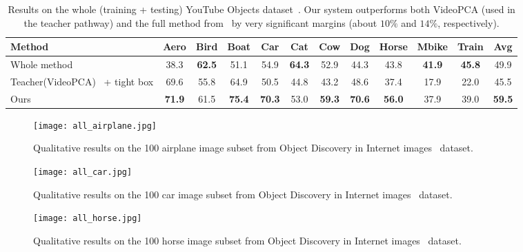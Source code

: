 \documentclass[10pt,twocolumn,letterpaper]{article}
\begin{document}
\begin{table*}[ht]
\begin{center}
\begin{tabular}{|l|*{10}{c|}|c|}
\hline
Method & Aero & Bird & Boat & Car & Cat & Cow & Dog & Horse & Mbike & Train & Avg \\
\hline\hline
Whole method~\cite{stretcu2015multiple} & 38.3 & \textbf{62.5} & 51.1 & 54.9 & \textbf{64.3} & 52.9 & 44.3 & 43.8 & \textbf{41.9} & \textbf{45.8} & 49.9 \\
Teacher(VideoPCA)~\cite{stretcu2015multiple} + tight box & 69.6 & 55.8 & 64.9 & 50.5 & 44.8 & 43.2 & 48.6 & 37.4 & 17.9 & 22.0 & 45.5 \\
\hline
Ours & \textbf{71.9} & 61.5 &\textbf{75.4} & \textbf{70.3} & 53.0 & \textbf{59.3} & \textbf{70.6} & \textbf{56.0} & 37.9 & 39.0 & \textbf{59.5} \\
\hline
\end{tabular}
\end{center}
\caption{Results on the whole (training + testing) YouTube Objects dataset~\cite{prest2012learning}. Our system outperforms both VideoPCA (used in the teacher pathway) and the full method from~\cite{stretcu2015multiple} by very significant margins (about $10\%$ and $14\%$, respectively).}
\label{tab:yto_all}
\end{table*}

\begin{figure*}
\begin{center}
   \texttt{[image: all\_airplane.jpg]}
\end{center}
   \caption{Qualitative results on the 100 airplane image subset from Object Discovery in Internet images~\cite{rubinstein2013unsupervised} dataset.}
\label{fig:all_airplane}
\end{figure*}

\begin{figure*}
\begin{center}
   \texttt{[image: all\_car.jpg]}
\end{center}
   \caption{Qualitative results on the 100 car image subset from Object Discovery in Internet images~\cite{rubinstein2013unsupervised} dataset.}
\label{fig:all_car}
\end{figure*}

\begin{figure*}
\begin{center}
   \texttt{[image: all\_horse.jpg]}
\end{center}
   \caption{Qualitative results on the 100 horse image subset from Object Discovery in Internet images~\cite{rubinstein2013unsupervised} dataset.}
\label{fig:all_horse}
\end{figure*}
\end{document}
